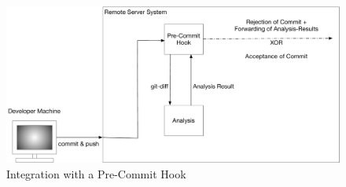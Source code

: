 \documentclass[a4paper]{article}
\begin{document}
\begin{figure}[htbp] 
  \centering
  \begin{minipage}[b]{1\textwidth} 
    \caption[Integration with a Pre-Commit Hook]{Integration with a Pre-Commit Hook}\label{fig:pre-commit}
    \includegraphics[width=1\textwidth]{img/IntegrationPreCommitHook.pdf}
  \end{minipage}
\end{figure}





\newpage


\end{document}
